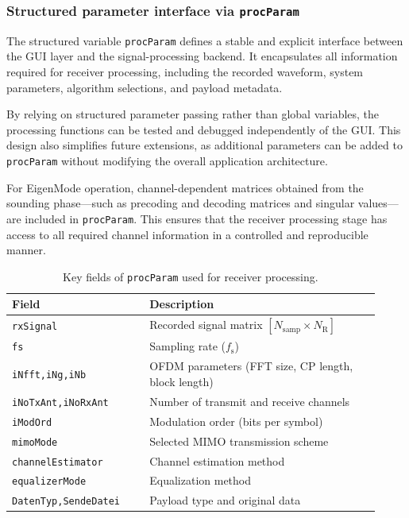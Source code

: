 \subsubsection{Structured parameter interface via \texttt{procParam}}
\label{sec:procparam_interface}

The structured variable \texttt{procParam} defines a stable and explicit interface between the GUI layer and the signal-processing backend. It encapsulates all information required for receiver processing, including the recorded waveform, system parameters, algorithm selections, and payload metadata.

By relying on structured parameter passing rather than global variables, the processing functions can be tested and debugged independently of the GUI. This design also simplifies future extensions, as additional parameters can be added to \texttt{procParam} without modifying the overall application architecture.

For EigenMode operation, channel-dependent matrices obtained from the sounding phase—such as precoding and decoding matrices and singular values—are included in \texttt{procParam}. This ensures that the receiver processing stage has access to all required channel information in a controlled and reproducible manner.

\begin{table}[t]
\centering
\caption{Key fields of \texttt{procParam} used for receiver processing.}
\label{tab:procparam_fields}
\begin{tabular}{p{0.34\linewidth}p{0.58\linewidth}}
\hline
Field & Description \\
\hline
\texttt{rxSignal} & Recorded signal matrix $[N_\text{samp} \times N_{\mathrm{R}}]$ \\
\texttt{fs} & Sampling rate ($f_{\mathrm{s}}$) \\
\texttt{iNfft,iNg,iNb} & OFDM parameters (FFT size, CP length, block length) \\
\texttt{iNoTxAnt,iNoRxAnt} & Number of transmit and receive channels \\
\texttt{iModOrd} & Modulation order (bits per symbol) \\
\texttt{mimoMode} & Selected MIMO transmission scheme \\
\texttt{channelEstimator} & Channel estimation method \\
\texttt{equalizerMode} & Equalization method \\
\texttt{DatenTyp,SendeDatei} & Payload type and original data \\
\hline
\end{tabular}
\end{table}

